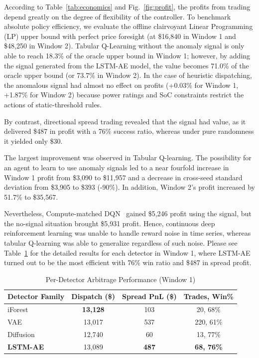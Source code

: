 \documentclass[journal]{IEEEtran}
\begin{document}
According to Table~\ref{tab:economics} and Fig.~\ref{fig:profit}, the profits from trading depend greatly on the degree of flexibility of the controller. To benchmark absolute policy efficiency, we evaluate the offline clairvoyant Linear Programming (LP) upper bound with perfect price foresight (at \$16,840 in Window 1 and \$48,250 in Window 2). Tabular Q-Learning without the anomaly signal is only able to reach 18.3\% of the oracle upper bound in Window 1; however, by adding the signal generated from the LSTM-AE model, the value becomes 71.0\% of the oracle upper bound (or 73.7\% in Window 2). In the case of heuristic dispatching, the anomalous signal had almost no effect on profits (+0.03\% for Window 1, +1.87\% for Window 2) because power ratings and SoC constraints restrict the actions of static-threshold rules.

By contrast, directional spread trading revealed that the signal had value, as it delivered \$487 in profit with a 76\% success ratio, whereas under pure randomness it yielded only \$30.

The largest improvement was observed in Tabular Q-learning. The possibility for an agent to learn to use anomaly signals led to a near fourfold increase in Window 1 profit from \$3,090 to \$11,957 and a decrease in cross-seed standard deviation from \$3,905 to \$393 (-90\%). In addition, Window 2's profit increased by 51.7\% to \$35,567.

Nevertheless, Compute-matched DQN~\cite{Mnih_DQN} gained \$5,246 profit using the signal, but the no-signal situation brought \$5,931 profit. Hence, continuous deep reinforcement learning was unable to handle reward noise in time series, whereas tabular Q-learning was able to generalize regardless of such noise. Please see Table~\ref{tab:perdetector} for the detailed results for each detector in Window 1, where LSTM-AE turned out to be the most efficient with 76\% win ratio and \$487 in spread profit.

\begin{table}[!t]
    \centering
    \caption{Per-Detector Arbitrage Performance (Window 1)}
    \label{tab:perdetector}
    \footnotesize
    \renewcommand{\arraystretch}{1.12}
    \setlength{\tabcolsep}{2.5pt}
    \begin{tabular*}{\columnwidth}{@{\extracolsep{\fill}}lccc@{}}
    \toprule
    \textbf{Detector Family} & \textbf{Dispatch (\$)} & \textbf{Spread PnL (\$)} & \textbf{Trades, Win\%} \\
    \midrule
    iForest & \textbf{13,128} & 103 & 20, 68\% \\
    VAE & 13,017 & 537 & 220, 61\% \\
    Diffusion & 12,740 & 60 & 13, 77\% \\
    \textbf{LSTM-AE} & 13,089 & \textbf{487} & \textbf{68, 76\%} \\
    \bottomrule
    \end{tabular*}
    \end{table}
\end{document}
